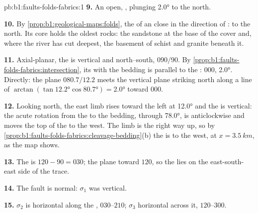 \begin{solution}{pb:b1:faults-folds-fabrics:1}
\textbf{9.} An open, , plunging \ang{2.0} to the north.

\textbf{10.} By \cref{prop:b1:geological-maps:folds}, the  of an
 close in the direction of : to the north. Its core holds the
oldest rocks: the sandstone at the base of the cover and, where the river has
cut deepest, the basement of schist and granite beneath it.

\textbf{11.} Axial-planar, the  is vertical and  north--south,
$090/90$. By \cref{prop:b1:faults-folds-fabrics:intersection}, its
 with the bedding is parallel to the : 
$000$,  \ang{2.0}. Directly: the plane $080.7/12.2$ meets the vertical
plane striking north along a line of  $\arctan(\tan\ang{12.2}
\cos\ang{80.7}) = \ang{2.0}$ toward $000$.

\textbf{12.} Looking north, the east limb rises toward the left at \ang{12.0}
and the  is vertical: the acute rotation from the  to the
bedding, through \ang{78.0}, is anticlockwise and moves the top of the
 to the west. The limb is the right way up, so by
\cref{prop:b1:faults-folds-fabrics:cleavage-bedding}(b) the   is
to the west, at $x = \qty{3.5}{km}$, as the map shows.

\textbf{13.} The  is $120 - 90 = 030$; the plane  toward $120$, so
the  lies on the east-south-east side of the trace.

\textbf{14.} The fault is normal: $\sigma_1$ was vertical.

\textbf{15.} $\sigma_2$ is horizontal along the , $030$--$210$;
$\sigma_3$ horizontal across it, $120$--$300$.


\end{solution}
